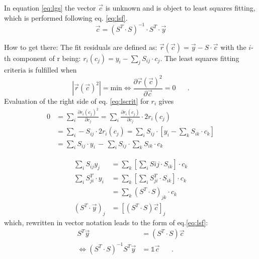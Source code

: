 \documentclass[a4paper]{article}
\begin{document}
\normalsize
In equation \ref{eq:lgs} the vector $\vec{c}$ is unknown and is object to least squares fitting, which is performed following eq. \ref{eq:lsf}.
\begin{equation}
\vec{c}=(S^{T}\cdot S)^{-1}\cdot S^{T} \cdot \vec{y}
\label{eq:lsf}
\end{equation}

How to get there: The fit residuals are defined as: $\vec{r}(\vec{c})=\vec{y}-S\cdot\vec{c}$ with the $i$-th component of r being: $r_i(c_j)=y_i - \sum\limits_j S_{ij} \cdot c_j$. The least squares fitting criteria is fulfilled when 
\begin{equation}
\left|\vec{r}(\vec{c})^2\right|=\mathrm{min}\Leftrightarrow\frac{\partial \vec{r}(\vec{c})^2}{\partial \vec{c}}=0\;\;\;\;\;\;.
\label{eq:lscrit}
\end{equation}
Evaluation of the right side of eq. \ref{eq:lscrit} for $r_i$ gives
\begin{align}
0 &= \sum\limits_i \frac{\partial r_i(c_j)^2}{\partial c_j} = \sum\limits_i \frac{\partial r_i(c_j)}{\partial c_j}\cdot 2r_i(c_j)\nonumber \\
&= \sum\limits_i -S_{ij}\cdot 2r_i(c_j) =\sum\limits_i S_{ij} \cdot \left[y_i - \sum\limits_k S_{ik} \cdot c_k\right]\nonumber\\
&=\sum\limits_i S_{ij}\cdot y_i\,-\, \sum\limits_i S_{ij}\cdot\sum\limits_k S_{ik} \cdot c_k \nonumber
\end{align}

\begin{align}
\sum\limits_i S_{ij}y_j &= \sum\limits_k\left[\sum\limits_i S{ij} \cdot S_{ik}\right] \cdot c_k \nonumber \\
\sum\limits_i S^{T}_{ji}\cdot y_i&= \sum\limits_k \left[\sum\limits_i S^T_{ji} \cdot S_{ik}\right] \cdot c_k \nonumber \\
&= \sum\limits_k \left(S^T\cdot S\right)_{jk}\cdot c_k \nonumber \\
\left(S^T\cdot\vec{y}\right)_j&= \left[\left(S^T\cdot S\right)\vec{c}\right]_j
\label{eq:berabl}
\end{align}
which, rewritten in vector notation leads to the form of eq.\ref{eq:lsf}:
\begin{align}
S^T \vec{y} &=\left(S^T\cdot S\right)\vec{c}\nonumber\\
\Leftrightarrow \left(S^T\cdot S\right)^{-1} S^T \vec{y} &= \mathbb{1}\vec{c}\;\;\;\;\;\;.
\label{eq:qed}
\end{align}
\end{document}
